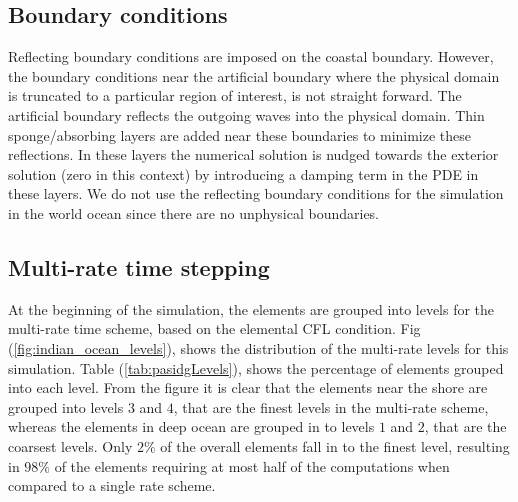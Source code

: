 \subsection{Boundary conditions}
Reflecting boundary conditions are imposed on the coastal boundary. However, the boundary conditions near the artificial boundary where the physical domain is truncated to a particular region of interest, is not straight forward. The artificial boundary reflects the outgoing waves into the physical domain. Thin sponge/absorbing layers are added near these boundaries \cite{modave2010parameters} to minimize these reflections. In these layers the numerical solution is nudged towards the exterior solution (zero in this context) by introducing a damping term in the PDE in these layers. We do not use the reflecting boundary conditions for the simulation in the world ocean since there are no unphysical boundaries. 


\subsection{Multi-rate time stepping}
At the beginning of the simulation, the elements are grouped into levels for the multi-rate time scheme, based on the elemental CFL condition. Fig (\ref{fig:indian_ocean_levels}), shows the distribution of the multi-rate levels for this simulation. Table (\ref{tab:pasidgLevels}), shows the percentage of elements grouped into each level.  From the figure it is clear that the elements near the shore are grouped into levels $3$ and $4$, that are the finest levels in the multi-rate scheme, whereas the elements in deep ocean are grouped in to levels $1$ and $2$, that are the coarsest levels. Only $2\%$ of the overall elements fall in to the finest level, resulting in $98\%$ of the elements requiring at most half of the computations when compared to a single rate scheme.


